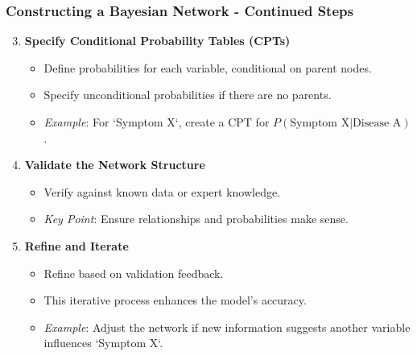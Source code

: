 \documentclass[aspectratio=169]{beamer}
\begin{document}
\begin{frame}[fragile]
    \frametitle{Constructing a Bayesian Network - Continued Steps}
    \begin{enumerate}
        \setcounter{enumi}{2}
        \item \textbf{Specify Conditional Probability Tables (CPTs)}
            \begin{itemize}
                \item Define probabilities for each variable, conditional on parent nodes.
                \item Specify unconditional probabilities if there are no parents.
                \item \textit{Example}: For `Symptom X`, create a CPT for $P(\text{Symptom X} | \text{Disease A})$.
            \end{itemize}

        \item \textbf{Validate the Network Structure}
            \begin{itemize}
                \item Verify against known data or expert knowledge.
                \item \textit{Key Point}: Ensure relationships and probabilities make sense.
            \end{itemize}

        \item \textbf{Refine and Iterate}
            \begin{itemize}
                \item Refine based on validation feedback.
                \item This iterative process enhances the model's accuracy.
                \item \textit{Example}: Adjust the network if new information suggests another variable influences `Symptom X`.
            \end{itemize}
    \end{enumerate}
\end{frame}
\end{document}
